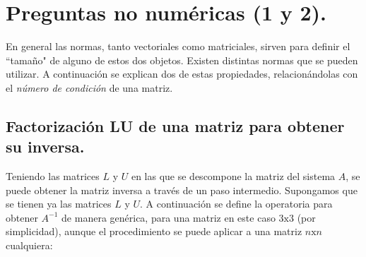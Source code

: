 \documentclass[12pt, notitlepage]{article}
\begin{document}
\clearpage
\setcounter{page}{1}

\section{Preguntas no numéricas (1 y 2).}
En general las normas, tanto vectoriales como matriciales, sirven para definir el ``tamaño" de alguno de estos dos objetos. Existen distintas normas que se pueden utilizar. A continuación se explican dos de estas propiedades, relacionándolas con el \textit{número de condición} de una matriz.

\subsection{Factorización LU de una matriz para obtener su inversa.}

Teniendo las matrices $L$ y $U$ en las que se descompone la matriz del sistema $A$, se puede obtener la matriz inversa a través de un paso intermedio. Supongamos que se tienen ya las matrices $L$ y $U$. A continuación se define la operatoria para obtener $A^{-1}$ de manera genérica, para una matriz en este caso $3\text{x}3$ (por simplicidad), aunque el procedimiento se puede aplicar a una matriz $n\text{x}n$ cualquiera:
\end{document}
